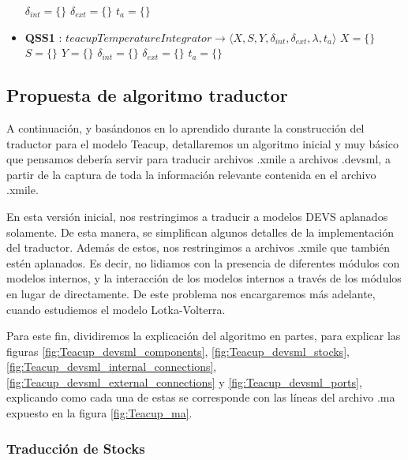 \begin{itemize}
$ \delta_{int} = \{ \} $ \newline
$ \delta_{ext} = \{ \} $ \newline
$ t_{a} = \{ \} $ 
\item \textbf{QSS1} : $ teacupTemperatureIntegrator \rightarrow \langle X, S, Y, \delta_{int}, \delta_{ext}, \lambda, t_{a} \rangle$ \newline
$ X = \{ \} $ \newline
$ S = \{ \} $ \newline
$ Y = \{ \} $ \newline
$ \delta_{int} = \{ \} $ \newline
$ \delta_{ext} = \{ \} $ \newline
$ t_{a} = \{ \} $ 
\end{itemize}

\subsection{Propuesta de algoritmo traductor}
A continuación, y basándonos en lo aprendido durante la construcción del traductor para el modelo Teacup, detallaremos un algoritmo inicial y muy básico que pensamos debería servir para traducir archivos .xmile a archivos .devsml, a partir de la captura de toda la información relevante contenida en el archivo .xmile.

En esta versión inicial, nos restringimos a traducir a modelos DEVS aplanados solamente. De esta manera, se simplifican algunos detalles de la implementación del traductor. Además de estos, nos restringimos a archivos .xmile que también estén aplanados. Es decir, no lidiamos con la presencia de diferentes módulos con modelos internos, y la interacción de los modelos internos a través de los módulos en lugar de directamente. De este problema nos encargaremos más adelante, cuando estudiemos el modelo Lotka-Volterra.

Para este fin, dividiremos la explicación del algoritmo en partes, para explicar las figuras \ref{fig:Teacup_devsml_components}, \ref{fig:Teacup_devsml_stocks}, \ref{fig:Teacup_devsml_internal_connections}, \ref{fig:Teacup_devsml_external_connections} y \ref{fig:Teacup_devsml_ports}, explicando como cada una de estas se corresponde con las líneas del archivo .ma expuesto en la figura \ref{fig:Teacup_ma}.

\subsubsection{Traducción de \textbf{Stocks}}
